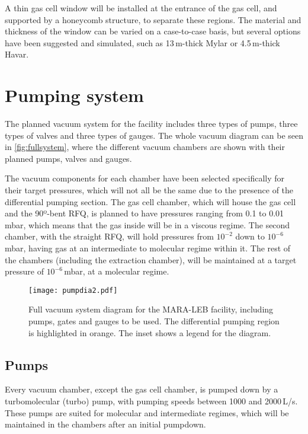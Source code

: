 A thin gas cell window will be installed at the entrance of the gas cell, and supported by a honeycomb structure, to separate these regions. The material and thickness of the window can be varied on a case-to-case basis, but several options have been suggested and simulated, such as 13\,\textmu m-thick Mylar or 4.5\,\textmu m-thick Havar.

\section{Pumping system}
\label{sec:pump}

The planned vacuum system for the facility includes three types of pumps, three types of valves and three types of gauges. The whole vacuum diagram can be seen in \autoref{fig:fullsystem}, where the different vacuum chambers are shown with their planned pumps, valves and gauges.

The vacuum components for each chamber have been selected specifically for their target pressures, which will not all be the same due to the presence of the differential pumping section. The gas cell chamber, which will house the gas cell and the 90º-bent RFQ, is planned to have pressures ranging from 0.1 to 0.01\,mbar, which means that the gas inside will be in a viscous regime. The second chamber, with the straight RFQ, will hold pressures from $10^{-2}$ down to $10^{-6}$\,mbar, having gas at an intermediate to molecular regime within it. The rest of the chambers (including the extraction chamber), will be maintained at a target pressure of $10^{-6}$\,mbar, at a molecular regime. 

\begin{figure}[h]
    \centering
    \texttt{[image: pumpdia2.pdf]}
     \caption{Full vacuum system diagram for the MARA-LEB facility, including pumps, gates and gauges to be used. The differential pumping region is highlighted in orange. The inset shows a legend for the diagram.}
     \label{fig:fullsystem}
 \end{figure}

\subsection{Pumps}
Every vacuum chamber, except the gas cell chamber, is pumped down by a turbomolecular (turbo) pump, with pumping speeds between 1000 and 2000\,L/s. These pumps are suited for molecular and intermediate regimes, which will be maintained in the chambers after an initial pumpdown.

